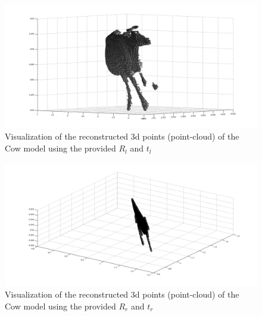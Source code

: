 \documentclass{paper}
\begin{document}
\begin{figure}[H]
\centering
\includegraphics[width=\textwidth]{figures/rec_left_1}
\caption{Visualization of the reconstructed 3d points (point-cloud) of the Cow model using the provided $R_l$ and $t_l$}
\label{fig:cow_rec_rltl}
\end{figure}

\begin{figure}[H]
\centering
\includegraphics[width=\textwidth]{figures/rec_right_1}
\caption{Visualization of the reconstructed 3d points (point-cloud) of the Cow model using the provided $R_r$ and $t_r$}
\label{fig:cow_rec_rrtr}
\end{figure}
\end{document}
